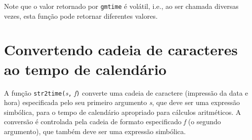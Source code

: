 \documentclass[11pt, brazil]{report}
\begin{document}
Note que o valor retornado por {\tt gmtime} é volátil, i.e., ao ser
chamada diversas vezes, esta função pode retornar diferentes valores.

%
%
%
%
%
%
%
%

\section{Convertendo cadeia de caracteres ao tempo de calendário}
\label{str2time}

A função {\tt str2time(}{\it s}{\tt,} {\it f}{\tt)} converte uma
cadeia de caractere (impressão da data e hora) \linebreak especificada pelo seu
primeiro argumento {\it s}, que deve ser uma expressão simbólica,
para o tempo de calendário apropriado para cálculos aritméticos.
A conversão é controlada pela cadeia de formato especificado {\it f}
(o segundo argumento), que também deve ser uma expressão simbólica.
\end{document}
